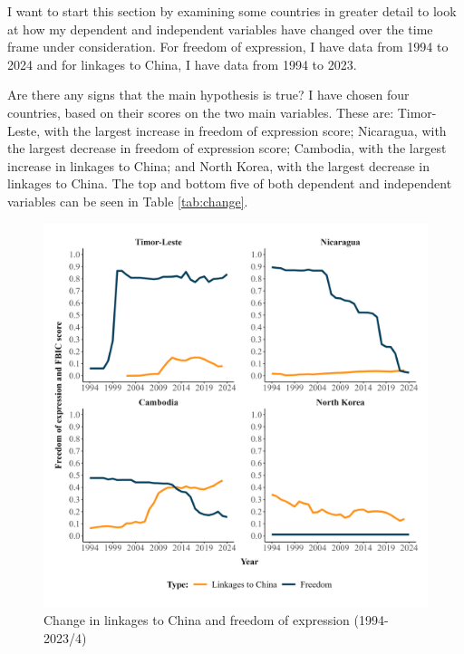 I want to start this section by examining some countries in greater detail to look at how my dependent and independent variables have changed over the time frame under consideration. For freedom of expression, I have data from 1994 to 2024 and for linkages to China, I have data from 1994 to 2023. 

Are there any signs that the main hypothesis is true? I have chosen four countries, based on their scores on the two main variables. These are: Timor-Leste, with the largest increase in freedom of expression score; Nicaragua, with the largest decrease in freedom of expression score; Cambodia, with the largest increase in linkages to China; and North Korea, with the largest decrease in linkages to China. The top and bottom five of both dependent and independent variables can be seen in Table \ref{tab:change}.

\begin{figure}[!hbt]
    \centering
    \includegraphics[width=\linewidth]{graphics/single_country_plots.jpeg}
    \caption{Change in linkages to China and freedom of expression (1994-2023/4)}
    \label{fig:scp}
\end{figure}


